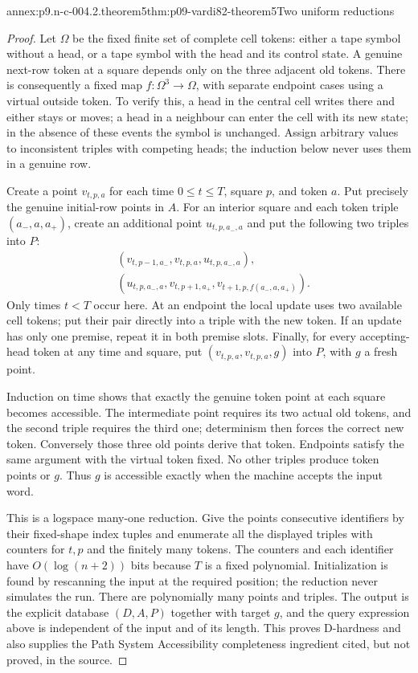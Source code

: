 \begin{annexitem}{annex:p9.n-c-004.2.theorem5}{thm:p09-vardi82-theorem5}{Two uniform reductions}
\begin{proof}
Let \(\Omega\) be the fixed finite set of complete cell tokens: either
a tape symbol without a head, or a tape symbol with the head and its
control state. A genuine next-row token at a square depends only on the
three adjacent old tokens. There is consequently a fixed map
\(f:\Omega^3\to\Omega\), with separate endpoint cases using a virtual
outside token. To verify this, a head in the central cell writes there
and either stays or moves; a head in a neighbour can enter the cell with
its new state; in the absence of these events the symbol is unchanged.
Assign arbitrary values to inconsistent triples with competing heads;
the induction below never uses them in a genuine row.

Create a point \(v_{t,p,a}\) for each time \(0\leq t\leq T\), square
\(p\), and token \(a\). Put precisely the genuine initial-row points
in \(A\). For an interior square and each token triple
\((a_-,a,a_+)\), create an additional point \(u_{t,p,a_-,a}\) and put
the following two triples into \(P\):
\[
\begin{split}
 &(v_{t,p-1,a_-},v_{t,p,a},u_{t,p,a_-,a}),\\
 &(u_{t,p,a_-,a},v_{t,p+1,a_+},
                  v_{t+1,p,f(a_-,a,a_+)}).
\end{split}
\]
Only times \(t<T\) occur here. At an endpoint the local update uses two
available cell tokens; put their pair directly into a triple with the
new token. If an update has only one premise, repeat it in both premise
slots. Finally, for every accepting-head token at any time and square,
put \((v_{t,p,a},v_{t,p,a},g)\) into \(P\), with \(g\) a fresh point.

Induction on time shows that exactly the genuine token point at each
square becomes accessible. The intermediate point requires its two actual
old tokens, and the second triple requires the third one; determinism
then forces the correct new token. Conversely those three old points
derive that token. Endpoints satisfy the same argument with the virtual
token fixed. No other triples produce token points or \(g\). Thus \(g\)
is accessible exactly when the machine accepts the input word.

This is a logspace many-one reduction. Give the points consecutive
identifiers by their fixed-shape index tuples and enumerate all the
displayed triples with counters for \(t,p\) and the finitely many tokens.
The counters and each identifier have \(O(\log(n+2))\) bits because
\(T\) is a fixed polynomial. Initialization is found by rescanning the
input at the required position; the reduction never simulates the run.
There are polynomially many points and triples. The output is the
explicit database \((D,A,P)\) together with target \(g\), and the query
expression above is independent of the input and of its length. This
proves D-hardness and also supplies the Path System Accessibility
completeness ingredient cited, but not proved, in the source.


\end{proof}
\end{annexitem}
